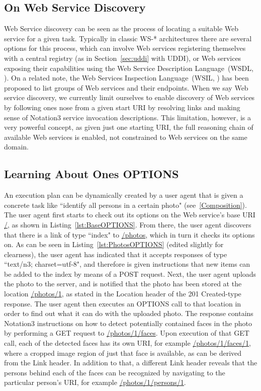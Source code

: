 \documentclass[runningheads,a4paper, twocolumn]{llncs}
\begin{document}
\subsection{On Web Service Discovery}
Web Service discovery can be seen as the process of locating a suitable Web service for a given task. Typically in classic WS-* architectures there are several options for this process, which can involve Web services registering themselves with a central registry (as in Section~\ref{sec:uddi} with UDDI), or Web services exposing their capabilities using the Web Service Description Language~(WSDL, \cite{WSDL1, WSDL2}). On a related note, the Web Services Inspection Language~(WSIL, \cite{WSIL}) has been proposed to list groups of Web services and their endpoints. When we say Web service discovery, we currently limit ourselves to enable discovery of Web services by following ones nose from a given start URI by resolving links and making sense of Notation3 service invocation descriptions. This limitation, however, is a very powerful concept, as given just one starting URI, the full reasoning chain of available Web services is enabled, not constrained to Web services on the same domain.

\subsection{Learning About Ones OPTIONS} \label{MainStory}
An execution plan can be dynamically created by a user agent that is given a concrete task like ``identify all persons in a certain photo" (see~\ref{Composition}). The user agent first starts to check out its options on the Web service's base URI \url{/}, as shown in Listing~\ref{lst:BaseOPTIONS}. From there, the user agent discovers that there is a link of type ``index" to \url{/photos}, which in turn it checks its options on. As can be seen in Listing~\ref{lst:PhotosOPTIONS} (edited slightly for clearness), the user agent has indicated that it accepts responses of type ``text/n3; charset=utf-8", and therefore is given instructions that new items can be added to the index by means of a POST request. Next, the user agent uploads the photo to the server, and is notified that the photo has been stored at the location \url{/photos/1}, as stated in the Location header of the 201 Created-type response. The user agent then executes an OPTIONS call to that location in order to find out what it can do with the uploaded photo. The response contains Notation3 instructions on how to detect potentially contained faces in the photo by performing a GET request to \url{/photos/1/faces}.  Upon execution of that GET call, each of the detected faces has its own URI, for example \url{/photos/1/faces/1}, where a cropped image region of just that face is available, as can be derived from the Link header. In addition to that, a different Link header reveals that the persons behind each of the faces can be recognized by navigating to the particular person's URI, for example \url{/photos/1/persons/1}.
\end{document}
